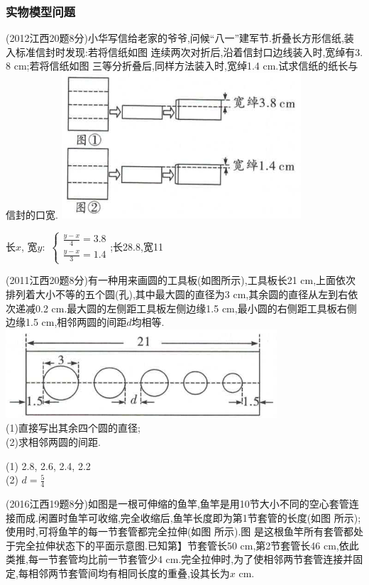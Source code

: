 \documentclass[cn,blue,12pt]{elegantbook}
\begin{document}
\subsubsection{实物模型问题}%
\begin{zhenti}[resume]
\item  (2012江西20题8分)小华写信给老家的爷爷,问候``八一''建军节.折叠长方形信纸,装入标准信封时发现:若将信纸如图 连续两次对折后,沿着信封口边线装入时,宽绰有3. 8 cm;若将信纸如图 三等分折叠后,同样方法装入时,宽绰1.4 cm.试求信纸的纸长与信封的口宽.
\includegraphics[width=0.5\linewidth]{pic/20200531002.png}
\begin{solution}
        长\(x\), 宽\(y:\) \(\begin{cases} \frac{y-x}{4}=3.8\\ \frac{y-x}{3}=1.4 \end{cases}\);长28.8,宽11
\end{solution}
\item  (2011江西20题8分)有一种用来画圆的工具板(如图所示),工具板长21 cm,上面依次排列着大小不等的五个圆(孔),其中最大圆的直径为3 cm,其余圆的直径从左到右依次递减0.2 cm.最大圆的左侧距工具板左侧边缘1.5 cm,最小圆的右侧距工具板右侧边缘1.5 cm,相邻两圆的间距\(d\)均相等.\\
\includegraphics[width=0.5\linewidth]{pic/20200531003.png}\\
(1)直接写出其余四个圆的直径;\\
(2)求相邻两圆的间距.
\begin{solution}
    (1) 2.8, 2.6, 2.4, 2.2\\
    (2) \(d=\frac{5}{4}\)
\end{solution}
\item  (2016江西19题8分)如图是一根可伸缩的鱼竿,鱼竿是用10节大小不同的空心套管连接而成.闲置时鱼竿可收缩,完全收缩后,鱼竿长度即为第1节套管的长度(如图 所示);使用时,可将鱼竿的每一节套管都完全拉伸(如图 所示).图 是这根鱼竿所有套管都处于完全拉伸状态下的平面示意图.已知第】节套管长50 cm,第2节套管长46 cm,依此类推,每一节套管均比前一节套管少4 cm.完全拉伸时,为了使相邻两节套管连接并固定,每相邻两节套管间均有相同长度的重叠,设其长为\(x\) cm.\\

\end{zhenti}
\end{document}
